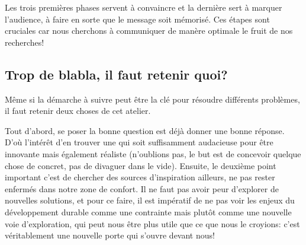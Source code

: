 Les trois premières phases servent à convaincre et la dernière sert à marquer l’audience, à faire en sorte que le message soit mémorisé. Ces étapes sont cruciales car nous cherchons à communiquer de manère optimale le fruit de nos recherches!


\subsection{Trop de blabla, il faut retenir quoi?}

Même si la démarche à suivre peut être la clé pour résoudre différents problèmes, il faut retenir deux choses de cet atelier. 

Tout d'abord, se poser la bonne question est déjà donner une bonne réponse. D’où l’intérêt d'en trouver une qui soit suffisamment audacieuse pour être innovante mais également réaliste (n'oublions pas, le but est de concevoir quelque chose de concret, pas de divaguer dans le vide). Ensuite, le deuxième point important c'est de chercher des sources d'inspiration ailleurs, ne pas rester enfermés dans notre zone de confort. Il ne faut pas avoir peur d'explorer de nouvelles solutions, et pour ce faire, il est impératif de ne pas voir les enjeux du développement durable comme une contrainte mais plutôt comme une nouvelle voie d'exploration, qui peut nous être plus utile que ce que nous le croyions: c'est véritablement une nouvelle porte qui s'ouvre devant nous!
